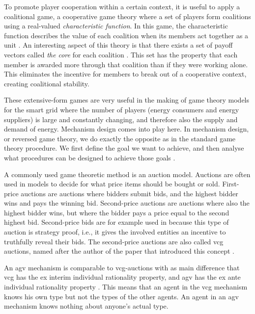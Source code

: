 To promote player cooperation within a certain context, it is useful to apply a coalitional game, a cooperative game theory where a set of players form coalitions using a real-valued \emph{characteristic function}. In this game, the characteristic function describes the value of each coalition when its members act together as a unit \cite{Ferguson2014}. An interesting aspect of this theory is that there exists a set of payoff vectors called \emph{the core} for each coalition \cite{Myerson1991}. This set has the property that each member is awarded more through that coalition than if they were working alone. This eliminates the incentive for members to break out of a cooperative context, creating coalitional stability. 


These extensive-form games are very useful in the making of game theory models for the smart grid where the number of players (energy consumers and energy suppliers) is large and constantly changing, and therefore also the supply and demand of energy. Mechanism design comes into play here. In mechanism design, or reversed game theory, we do exactly the opposite as in the standard game theory procedure. We first define the goal we want to achieve, and then analyse what procedures can be designed to achieve those goals \cite{SalfatiRabinovici2014}. 

A commonly used game theoretic method is an auction model. Auctions are often used in models to decide for what price items should be bought or sold. First-price auctions are auctions where bidders submit bids, and the highest bidder wins and pays the winning bid. Second-price auctions are auctions where also the highest bidder wins, but where the bidder pays a price equal to the second highest bid. Second-price bids are for example used in \cite{SaadHanPoorEtAl2011} because this type of auction is strategy proof, i.e., it gives the involved entities an incentive to truthfully reveal their bids. The second-price auctions are also called \ac{vcg} auctions, named after the author of the paper that introduced this concept \cite{Vickrey1961}.

An \ac{agv} mechanism is comparable to \ac{vcg}-auctions with as main difference that \ac{vcg} has the ex interim individual rationality property, and \ac{agv} has the ex ante individual rationality property \cite{ShohamLeyton-Brown2008}. This means that an agent in the \ac{vcg} mechanism knows his own type but not the types of the other agents. An agent in an \ac{agv} mechanism knows nothing about anyone’s actual type.  

